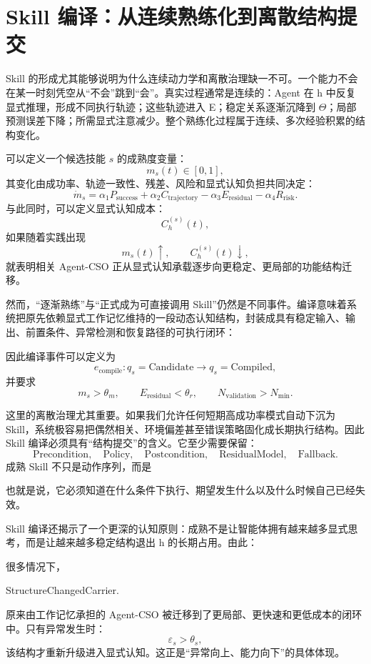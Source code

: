 \section{Skill 编译：从连续熟练化到离散结构提交}

Skill 的形成尤其能够说明为什么连续动力学和离散治理缺一不可。一个能力不会在某一时刻凭空从“不会”跳到“会”。真实过程通常是连续的：Agent 在 h 中反复显式推理，形成不同执行轨迹；这些轨迹进入 E；稳定关系逐渐沉降到 \(\Theta\)；局部预测误差下降；所需显式注意减少。整个熟练化过程属于连续、多次经验积累的结构变化。

可以定义一个候选技能 \(s\) 的成熟度变量：
\[
m_s(t)\in[0,1],
\]
其变化由成功率、轨迹一致性、残差、风险和显式认知负担共同决定：
\[
\dot m_s
=
\alpha_1 P_{\mathrm{success}}
+
\alpha_2 C_{\mathrm{trajectory}}
-
\alpha_3 E_{\mathrm{residual}}
-
\alpha_4 R_{\mathrm{risk}}.
\]
与此同时，可以定义显式认知成本：
\[
C_h^{(s)}(t),
\]
如果随着实践出现
\[
m_s(t)\uparrow,
\qquad
C_h^{(s)}(t)\downarrow,
\]
就表明相关 Agent-CSO 正从显式认知承载逐步向更稳定、更局部的功能结构迁移。

然而，“逐渐熟练”与“正式成为可直接调用 Skill”仍然是不同事件。编译意味着系统把原先依赖显式工作记忆维持的一段动态认知结构，封装成具有稳定输入、输出、前置条件、异常检测和恢复路径的可执行闭环：
\begin{statementbox}
\centering
{}
\end{statementbox}
因此编译事件可以定义为
\[
e_{\mathrm{compile}}
:
q_s=
\mathrm{Candidate}
\rightarrow
q_s=
\mathrm{Compiled},
\]
并要求
\[
m_s>\theta_m,
\qquad
E_{\mathrm{residual}}<\theta_r,
\qquad
N_{\mathrm{validation}}>N_{\min}.
\]

这里的离散治理尤其重要。如果我们允许任何短期高成功率模式自动下沉为 Skill，系统极容易把偶然相关、环境偏差甚至错误策略固化成长期执行结构。因此 Skill 编译必须具有“结构提交”的含义。它至少需要保留：
\[
\mathrm{Precondition},
\quad
\mathrm{Policy},
\quad
\mathrm{Postcondition},
\quad
\mathrm{ResidualModel},
\quad
\mathrm{Fallback}.
\]
成熟 Skill 不只是动作序列，而是
\begin{statementbox}
\centering
{}
\end{statementbox}
也就是说，它必须知道在什么条件下执行、期望发生什么以及什么时候自己已经失效。

Skill 编译还揭示了一个更深的认知原则：成熟不是让智能体拥有越来越多显式思考，而是让越来越多稳定结构退出 h 的长期占用。由此：
\begin{statementbox}
\centering
{}
\end{statementbox}
很多情况下，
\begin{statementbox}
StructureChangedCarrier.
\end{statementbox}
原来由工作记忆承担的 Agent-CSO 被迁移到了更局部、更快速和更低成本的闭环中。只有异常发生时：
\[
\varepsilon_s>\theta_s,
\]
该结构才重新升级进入显式认知。这正是“异常向上、能力向下”的具体体现。

